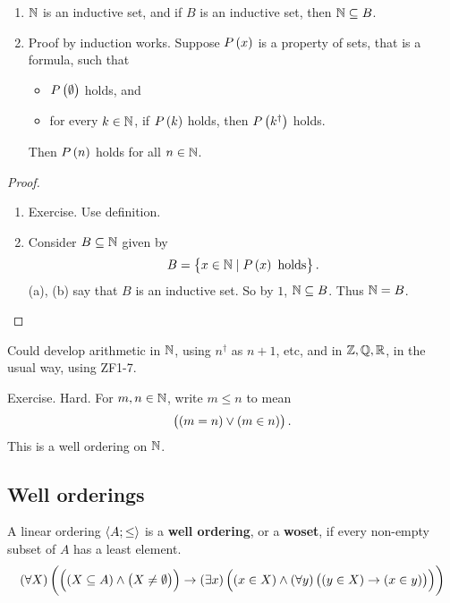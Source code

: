 \begin{theorem}
\label{thm:3.2.3}
\hfill
\begin{enumerate}
\item $ \mathbb{N} $ is an inductive set, and if $ B $ is an inductive set, then $ \mathbb{N} \subseteq B $.
\item Proof by induction works. Suppose $ P\br{x} $ is a property of sets, that is a formula, such that
\begin{itemize}
\item $ P\br{\emptyset} $ holds, and
\item for every $ k \in \mathbb{N} $, if $ P\br{k} $ holds, then $ P\br{k^\dagger} $ holds.
\end{itemize}
Then $ P\br{n} $ holds for all $ n \in \mathbb{N} $.
\end{enumerate}
\end{theorem}

\begin{proof}
\hfill
\begin{enumerate}
\item Exercise. Use definition.
\item Consider $ B \subseteq \mathbb{N} $ given by
$$ B = \cbr{x \in \N \mid P\br{x} \ \text{holds}}. $$
(a), (b) say that $ B $ is an inductive set. So by $ 1 $, $ \mathbb{N} \subseteq B $. Thus $ \mathbb{N} = B $.
\end{enumerate}
\end{proof}

Could develop arithmetic in $ \mathbb{N} $, using $ n^\dagger $ as $ n + 1 $, etc, and in $ \mathbb{Z}, \mathbb{Q}, \mathbb{R} $, in the usual way, using ZF1-7.

\begin{example*}
Exercise. Hard. For $ m, n \in \mathbb{N} $, write $ m \le n $ to mean
$$ \orb{\eqb{m}{n}}{\inb{m}{n}}. $$
This is a well ordering on $ \mathbb{N} $.
\end{example*}

\pagebreak

\subsection{Well orderings}

\begin{definition}
A linear ordering $ \left\langle A; \le \right\rangle $ is a \textbf{well ordering}, or a \textbf{woset}, if every non-empty subset of $ A $ has a least element.
$$ \fab{X}\impb{\andb{\subb{X}{A}}{\neb{X}{\emptyset}}}{\teb{x}\andb{\inb{x}{X}}{\fab{y}\impb{\inb{y}{X}}{\inb{x}{y}}}} $$
\end{definition}

